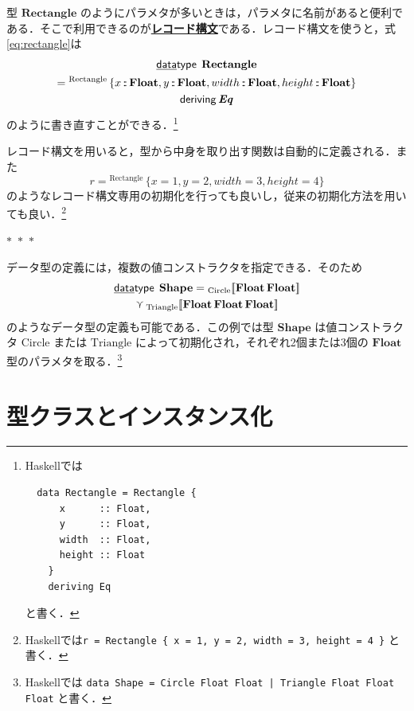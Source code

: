 \documentclass[a5paper,twoside,fleqn,draft]{jsbook}
\def\[{[\![}
\def\]{]\!]}
\newcommand{\separator}{\begin{center}$*$~$*$~$*$\end{center}}
\newcommand{\programminglanguage}[1]{\textsf{#1}}
\newcommand{\haskell}{\programminglanguage{Haskell}}
\newcommand{\keyword}[1]{{\underline{\textbf{#1}}}}
\newcommand{\code}[1]{\texttt{#1}}
\newcommand{\mKeyword}[1]{\mathsf{#1}}
\newcommand{\mKeywordUnderline}[1]{\text{\underline{\textsf{#1}}}}
\newcommand{\mDataTypeKeyword}{\mKeywordUnderline{data}\mKeyword{type}}
\newcommand{\mDerivingKeyword}{\mKeyword{deriving}}
\DeclareMathOperator{\mDataType}{\mDataTypeKeyword}
\DeclareMathOperator{\mDeriving}{\mDerivingKeyword}
\DeclareMathOperator{\mIn}{{:\!:}}
\DeclareMathOperator{\mValueOr}{\curlyvee}
\newcommand{\mType}[1]{\mathbf{#1}} %
\newcommand{\mFloatType}{\mType{Float}}
\newcommand{\mValueConstructor}[1]{\mathrm{#1}}
\newcommand{\mValueWith}[2]{{}_\mValueConstructor{#1}\[#2\]}
\newcommand{\mValueRecordBeginWith}[1]{{}^\mValueConstructor{#1}\,\{}
\newcommand{\mValueRecordEnd}{\}}
\newcommand{\mValueRecordWith}[2]{\mValueRecordBeginWith{#1}{#2}\mValueRecordEnd}
\newcommand{\mTypeClass}[1]{\textbf{\textit{#1}}}
\newcommand{\mEqTypeClass}{\mTypeClass{Eq}}
\begin{document}
型 $\mType{Rectangle}$ のようにパラメタが多いときは，パラメタに名前があると便利である．そこで利用できるのが\keyword{レコード構文}である．レコード構文を使うと，式\eqref{eq:rectangle}は
\begin{multline}
  \mDataType\;\mType{Rectangle}\\
  =\mValueRecordBeginWith{Rectangle}
  x\mIn\mFloatType,
  y\mIn\mFloatType,
  width\mIn\mFloatType,
  height\mIn\mFloatType
  \mValueRecordEnd\\
  \mDeriving\mEqTypeClass
\end{multline}
のように書き直すことができる．\footnote{\haskell では
\begin{verbatim}
  data Rectangle = Rectangle {
      x      :: Float,
      y      :: Float,
      width  :: Float,
      height :: Float
    }
    deriving Eq
\end{verbatim}
と書く．}

レコード構文を用いると，型から中身を取り出す関数は自動的に定義される．また
\begin{equation}
  r=
  \mValueRecordWith{Rectangle}{
    x=1,
    y=2,
    width=3,
    height=4
  }
\end{equation}
のようなレコード構文専用の初期化を行っても良いし，従来の初期化方法を用いても良い．\footnote{\haskell では\code{r = Rectangle \{ x = 1, y = 2, width = 3, height = 4 \}} と書く．}

\separator

データ型の定義には，複数の値コンストラクタを指定できる．そのため
\begin{multline}
\mDataType\;\mType{Shape}
=\mValueWith{Circle}{\mFloatType\,\mFloatType}\\
\mValueOr
\mValueWith{Triangle}{\mFloatType\,\mFloatType\,\mFloatType}
\end{multline}
のようなデータ型の定義も可能である．この例では型 $\mType{Shape}$ は値コンストラクタ $\mValueConstructor{Circle}$ または $\mValueConstructor{Triangle}$ によって初期化され，それぞれ2個または3個の $\mFloatType$ 型のパラメタを取る．\footnote{\haskell では \code{data Shape = Circle Float Float | Triangle Float Float Float} と書く．}

\section{型クラスとインスタンス化}
\label{sec:type-class-and-instance}
\end{document}
